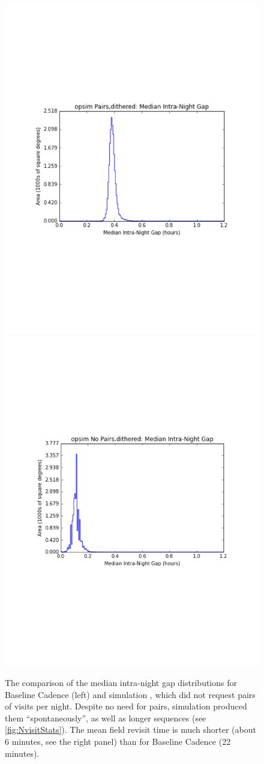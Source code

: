 \begin{figure}[t!]
\vskip -1.2in
\includegraphics[angle=0,width=0.49\hsize:,clip]{figs/medinternight1.pdf}
\includegraphics[angle=0,width=0.49\hsize:,clip]{figs/medinternight2.pdf}
\vskip -1.3in
\caption{
The comparison of the median intra-night gap distributions for Baseline Cadence (left)
and simulation , which did not request pairs of visits per night.
Despite no need for pairs, simulation  produced them ``spontaneously'',
as well as longer sequences (see \autoref{fig:NvisitStats}). The mean field revisit
time is much shorter (about 6 minutes, see the right panel) than for Baseline Cadence
(22 minutes).}
\label{fig:intranightgapCompare}
\end{figure}

